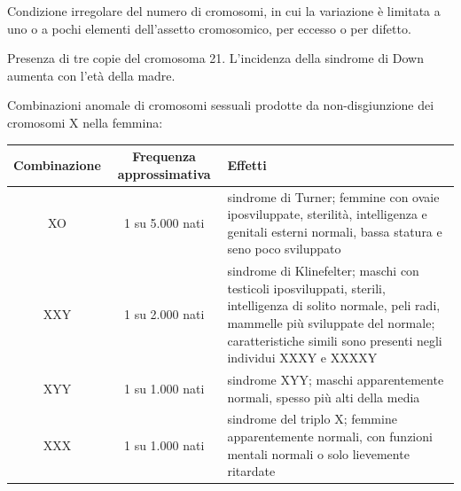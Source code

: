 Condizione irregolare del numero di cromosomi, in cui la variazione è limitata a uno o a pochi elementi dell'assetto cromosomico, per eccesso o per difetto.

Presenza di tre copie del cromosoma 21. L'incidenza della sindrome di Down aumenta con l'età della madre.

Combinazioni anomale di cromosomi sessuali prodotte da non-disgiunzione dei cromosomi X nella femmina:

\begin{table}[htbp]
  \centering
  \small
  \renewcommand{\arraystretch}{1.3}
  \begin{tabularx}{\textwidth}{|c|c|X|}
    \hline
    \textbf{Combinazione} & \textbf{Frequenza approssimativa} & \textbf{Effetti} \\
    \hline
    XO & 1 su 5.000 nati & sindrome di Turner; femmine con ovaie iposviluppate, sterilità, intelligenza e genitali esterni normali, bassa statura e seno poco sviluppato \\
    \hline
    XXY & 1 su 2.000 nati & sindrome di Klinefelter; maschi con testicoli iposviluppati, sterili, intelligenza di solito normale, peli radi, mammelle più sviluppate del normale; caratteristiche simili sono presenti negli individui XXXY e XXXXY \\
    \hline
    XYY & 1 su 1.000 nati & sindrome XYY; maschi apparentemente normali, spesso più alti della media \\
    \hline
    XXX & 1 su 1.000 nati & sindrome del triplo X; femmine apparentemente normali, con funzioni mentali normali o solo lievemente ritardate \\
    \hline
  \end{tabularx}
\end{table}


